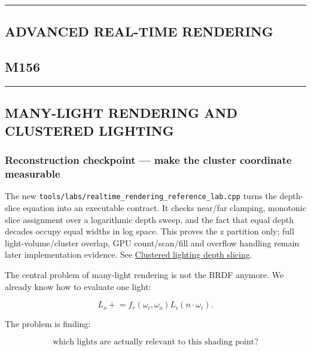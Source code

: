 \begin{center}\rule{0.5\linewidth}{0.5pt}\end{center}

\subsection{ADVANCED REAL-TIME RENDERING}\label{04-visual-computing-ii-ch040-advanced-real-time-rendering}

\subsection{M156}\label{04-visual-computing-ii-ch040-m156}

\begin{center}\rule{0.5\linewidth}{0.5pt}\end{center}

\subsection{MANY-LIGHT RENDERING AND CLUSTERED LIGHTING}\label{04-visual-computing-ii-ch040-many-light-rendering-and-clustered-lighting}

\subsubsection{Reconstruction checkpoint --- make the cluster coordinate measurable}\label{04-visual-computing-ii-ch040-reconstruction-checkpoint-make-the-cluster-coordinate-measurable}

The new \texttt{tools/labs/realtime\_rendering\_reference\_lab.cpp} turns the depth-slice equation into an executable contract. It checks near/far clamping, monotonic slice assignment over a logarithmic depth sweep, and the fact that equal depth decades occupy equal widths in log space. This proves the z partition only; full light-volume/cluster overlap, GPU count/scan/fill and overflow handling remain later implementation evidence. See \hyperref[appendix-b0efeb3f3648]{Clustered lighting depth slicing}.

The central problem of many-light rendering is not the BRDF anymore. We already know how to evaluate one light:

\[
L_o \mathrel{+}=
f_r(\omega_i,\omega_o)
L_i
(n\cdot\omega_i).
\]

The problem is finding:

\[
\boxed{
\text{which lights are actually relevant to this shading point?}
}
\]

